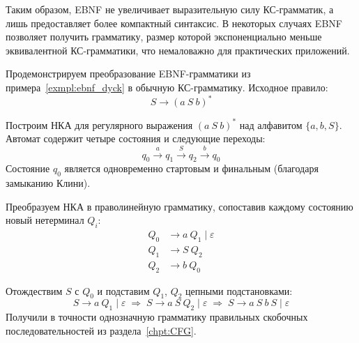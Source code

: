 Таким образом, EBNF не увеличивает выразительную силу КС-грамматик, а лишь предоставляет более компактный синтаксис.
В некоторых случаях EBNF позволяет получить грамматику, размер которой экспоненциально меньше эквивалентной КС-грамматики, что немаловажно для практических приложений.

\begin{example}
    \label{exmpl:ebnf_conversion}
    Продемонстрируем преобразование EBNF-грамматики из примера~\ref{exmpl:ebnf_dyck} в обычную КС-грамматику.
    Исходное правило:
    \[
    S \to (a \ S \ b)^*
    \]

    Построим НКА для регулярного выражения $(a \ S \ b)^*$ над алфавитом $\{a, b, S\}$.
    Автомат содержит четыре состояния и следующие переходы:
    \[
    q_0 \xrightarrow{a} q_1 \xrightarrow{S} q_2 \xrightarrow{b} q_0
    \]
    Состояние $q_0$ является одновременно стартовым и финальным (благодаря замыканию Клини).

    Преобразуем НКА в праволинейную грамматику, сопоставив каждому состоянию новый нетерминал $Q_i$:
    \begin{align*}
        Q_0 & \to a \ Q_1 \mid \varepsilon \\
        Q_1 & \to S \ Q_2                  \\
        Q_2 & \to b \ Q_0
    \end{align*}

    Отождествим $S$ с $Q_0$ и подставим $Q_1$, $Q_2$ цепными подстановками:
    \[
    S \to a \ Q_1 \mid \varepsilon \;\Rightarrow\; S \to a \ S \ Q_2 \mid \varepsilon \;\Rightarrow\; S \to a \ S \ b \ S \mid \varepsilon
    \]
    Получили в точности однозначную грамматику правильных скобочных последовательностей из раздела~\ref{chpt:CFG}.
\end{example}
